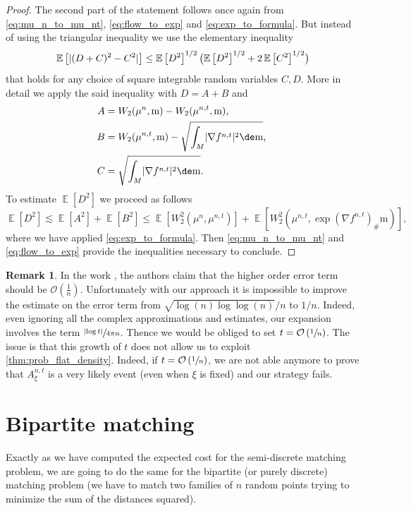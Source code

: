 \documentclass[10pt]{amsart}
\theoremstyle{plain}
\theoremstyle{definition}
\newtheorem{remark}[remark]{Remark}
\numberwithin{equation}{section}
\newcommand{\E}[1]{\ensuremath{\operatorname{\mathbb{E}}\left[#1\right]}}
\newcommand{\bigo}{\ensuremath{\mathcal{O}}}
\renewcommand{\comma}{\ensuremath{\text{, }}}
\newcommand{\comma}{\ensuremath{\text{, }}}
\newcommand{\fullstop}{\ensuremath{\text{. }}}
\newcommand{\m}{\ensuremath{\mathrm m}}
\DeclarePairedDelimiter\abs{\lvert}{\rvert}
\begin{document}
\begin{proof}
The second part of the statement follows once again from \cref{eq:mu_n_to_mu_nt},
\cref{eq:flow_to_exp} and \cref{eq:exp_to_formula}.
But instead of using the triangular inequality we use the elementary inequality
\begin{equation*}
\E{\abs{(D+C)^2-C^2}} \le
\E{D^2}^{1/2}\bigl(\E{D^2}^{1/2}+2\E{C^2}^{1/2}\bigr)
\end{equation*}
that holds for any choice of square integrable random variables $C, D$.
More in detail we apply the said inequality with $D=A+B$ and
\begin{align*}
A &= W_2(\mu^n, \m) - W_2(\mu^{n,t}, \m) \comma\\
B &= W_2(\mu^{n,t}, \m) - \sqrt{\int_M\abs{\nabla f^{n,t}}^2\de\m} \comma\\
C &= \sqrt{\int_M\abs{\nabla f^{n,t}}^2\de\m} \fullstop
\end{align*}
To estimate $\E{D^2}$ we proceed as follows
\begin{equation*}
\E{D^2} \lesssim \E{A^2} + \E{B^2} \le \E{W_2^2(\mu^n, \mu^{n,t})} +
\E{W_2^2(\mu^{n,t}, \exp(\nabla f^{n,t})_\#\m)} \comma
\end{equation*}
where we have applied \cref{eq:exp_to_formula}. Then \cref{eq:mu_n_to_mu_nt} and \cref{eq:flow_to_exp} provide the inequalities necessary to conclude.
\end{proof}

\begin{remark}
In the work \cite{CaraccioloEtAl2014}, the authors claim that the higher order error term
should be $\bigo(\frac1n)$.
Unfortunately with our approach it is impossible to improve the estimate on the error term
from $\sqrt{\log(n)\log\log(n)}/n$ to $1/n$. Indeed, even ignoring all the complex approximations and
estimates, our expansion involves the term $\sfrac{\abs{\log t}}{4\pi n}$.
Thence we would be obliged to set $t = \bigo\left(\sfrac 1n\right)$.
The issue is that this growth of $t$ does not allow us to exploit \cref{thm:prob_flat_density}.
Indeed, if $t = \bigo\left(\sfrac 1n\right)$, we are not able anymore to prove that
$A^{n,t}_\xi$ is a very likely event (even when $\xi$ is fixed) and our strategy fails.
\end{remark}

\section{Bipartite matching}\label{sec:bipartite_matching}
Exactly as we have computed the expected cost for the semi-discrete matching problem, we are going to do
the same for the bipartite (or purely discrete) matching problem (\ie we have to match two families
of $n$ random points trying to minimize the sum of the distances squared).
\end{document}
